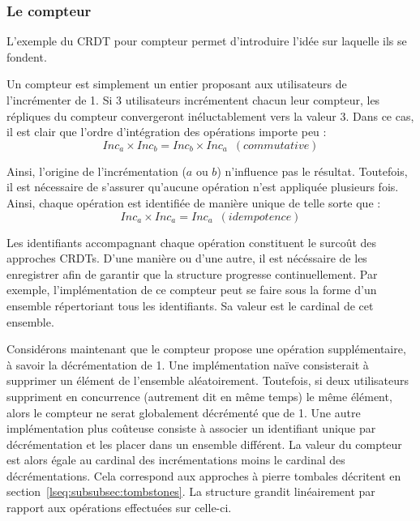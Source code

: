 
\subsubsection{Le compteur}

L'exemple du CRDT pour compteur permet d'introduire l'idée sur laquelle ils se
fondent. 


Un compteur est simplement un entier proposant aux utilisateurs de l'incrémenter
de 1. Si 3 utilisateurs incrémentent chacun leur compteur, les répliques du
compteur convergeront inéluctablement vers la valeur 3. Dans ce cas, il est
clair que l'ordre d'intégration des opérations importe peu :
\begin{equation}
  Inc_a \times Inc_b = Inc_b \times Inc_a \, \, \, (commutative)
\end{equation}

Ainsi, l'origine de l'incrémentation ($a$ ou $b$) n'influence pas le résultat.
Toutefois, il est nécessaire de s'assurer qu'aucune opération n'est appliquée
plusieurs fois. Ainsi, chaque opération est identifiée de manière unique de telle
sorte que :
\begin{equation}
  Inc_a \times Inc_a = Inc_a \, \, \, (idempotence)
\end{equation}

Les identifiants accompagnant chaque opération constituent le surcoût des
approches CRDTs. D'une manière ou d'une autre, il est nécéssaire de les
enregistrer afin de garantir que la structure progresse continuellement. Par
exemple, l'implémentation de ce compteur peut se faire sous la forme d'un
ensemble répertoriant tous les identifiants. Sa valeur est le cardinal de cet
ensemble.

Considérons maintenant que le compteur propose une opération supplémentaire, à
savoir la décrémentation de 1. Une implémentation naïve consisterait à supprimer
un élément de l'ensemble aléatoirement. Toutefois, si deux utilisateurs
suppriment en concurrence (autrement dit en même temps) le même élément, alors
le compteur ne serat globalement décrémenté que de 1. Une autre implémentation
plus coûteuse consiste à associer un identifiant unique par décrémentation et
les placer dans un ensemble différent. La valeur du compteur est alors égale au
cardinal des incrémentations moins le cardinal des décrémentations. Cela
correspond aux approches à pierre tombales décritent en
section~\ref{lseq:subsubsec:tombstones}. La structure grandit linéairement par
rapport aux opérations effectuées sur celle-ci.  

